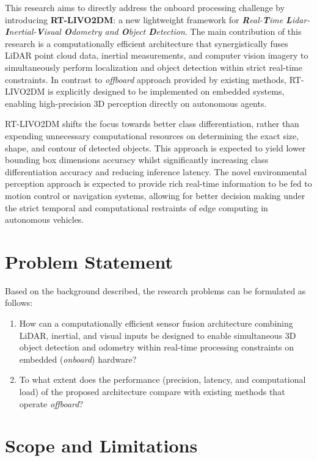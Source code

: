 This research aims to directly address the onboard processing challenge by introducing \textbf{RT-LIVO2DM}: a new lightweight framework for \emph{\textbf{R}eal-\textbf{T}ime \textbf{L}idar-\textbf{I}nertial-\textbf{V}isual \textbf{O}dometry and \textbf{O}bject \textbf{D}etection}. The main contribution of this research is a computationally efficient architecture that synergistically fuses LiDAR point cloud data, inertial measurements, and computer vision imagery to simultaneously perform localization and object detection within strict real-time constraints. In contrast to \emph{offboard} approach provided by existing methods, RT-LIVO2DM is explicitly designed to be implemented on embedded systems, enabling high-precision 3D perception directly on autonomous agents.

RT-LIVO2DM shifts the focus towards better class differentiation, rather than expending unnecessary computational resources on determining the exact size, shape, and contour of detected objects. This approach is expected to yield lower bounding box dimensions accuracy whilst significantly increasing class differentiation accuracy and reducing inference latency. The novel environmental perception approach is expected to provide rich real-time information to be fed to motion control or navigation systems, allowing for better decision making under the strict temporal and computational restraints of edge computing in autonomous vehicles.

\section{Problem Statement}
Based on the background described, the research problems can be formulated as follows:
\begin{enumerate}[nolistsep]
    \item How can a computationally efficient sensor fusion architecture combining LiDAR, inertial, and visual inputs be designed to enable simultaneous 3D object detection and odometry within real-time processing constraints on embedded (\emph{onboard}) hardware?
    \item To what extent does the performance (precision, latency, and computational load) of the proposed architecture compare with existing methods that operate \emph{offboard}?
\end{enumerate}

\section{Scope and Limitations}

